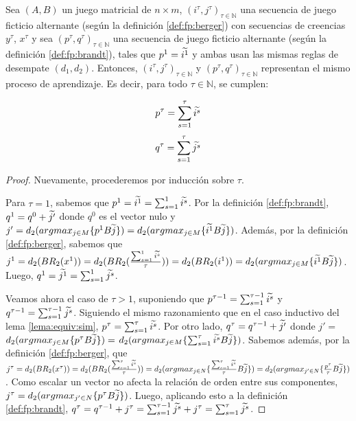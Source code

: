 \begin{lemma}
    Sea $(A, B)$ un juego matricial de $n \times m$, $(i^\tau, j^\tau)_{\tau \in \mathbb{N}}$ una secuencia de juego ficticio alternante (según la definición \ref{def:fp:berger}) con secuencias de creencias $y^\tau$, $x^\tau$ y sea $(p^\tau, q^\tau)_{\tau \in \mathbb{N}}$ una secuencia de juego ficticio alternante (según la definición \ref{def:fp:brandt}), tales que $p^1 = \widetilde{i^1}$ y ambas usan las mismas reglas de desempate $(d_1, d_2)$. Entonces, $(i^\tau, j^\tau)_{\tau \in \mathbb{N}}$ y $(p^\tau, q^\tau)_{\tau \in \mathbb{N}}$ representan el mismo proceso de aprendizaje. Es decir, para todo $\tau \in \mathbb{N}$, se cumplen:

    \[ p^{\tau} = \sum_{s=1}^\tau{\widetilde{i^s}} \]
    \[ q^{\tau} = \sum_{s=1}^\tau{\widetilde{j^s}} \]

\end{lemma}
\begin{proof}
    Nuevamente, procederemos por inducción sobre $\tau$.

    Para $\tau = 1$, sabemos que $p^1 = \widetilde{i^1} = \sum_{s=1}^1{\widetilde{i^s}}$.
    Por la definición \ref{def:fp:brandt}, $q^1 = q^0 + \widetilde{j'}$ donde $q^0$ es el vector nulo y
    $j' = d_2(argmax_{j \in M}\{p^{1}B\widetilde{j}\}) = d_2(argmax_{j \in M}\{\widetilde{i^{1}}B\widetilde{j}\})$.
    Además, por la definición \ref{def:fp:berger}, sabemos que
    $j^1 = d_2(BR_2(x^1)) = d_2(BR_2(\frac{\sum^1_{s=1} \widetilde{i^s}}{\tau})) = d_2(BR_2(i^1)) = d_2(argmax_{j \in M}\{\widetilde{i^{1}}B\widetilde{j}\})$.
    Luego, $q^1 = \widetilde{j^1} = \sum_{s=1}^1{\widetilde{j^s}}$.

    Veamos ahora el caso de $\tau > 1$, suponiendo que
    $p^{\tau-1} = \sum_{s=1}^{\tau-1}{\widetilde{i^s}}$ y $q^{\tau-1} = \sum_{s=1}^{\tau-1}{\widetilde{j^s}}$.
    Siguiendo el mismo razonamiento que en el caso inductivo del lema \ref{lema:equiv:sim},
    $p^{\tau} = \sum_{s=1}^\tau{\widetilde{i^s}}$.
    Por otro lado, $q^{\tau} = q^{\tau-1} + \widetilde{j'}$ donde
    $j' = $ $d_2(argmax_{j \in M}\{p^{\tau}B\widetilde{j}\}) =$ $d_2(argmax_{j \in M}\{\sum_{s=1}^\tau{\widetilde{i^s}}B\widetilde{j}\})$.
    Sabemos además, por la definición \ref{def:fp:berger}, que
    $j^\tau = d_2(BR_2(x^{\tau})) = d_2(BR_2(\frac{\sum_{s=1}^{\tau}{\widetilde{i^s}}}{\tau})) = d_2(argmax_{j \in N}\{\frac{\sum_{s=1}^{\tau}{\widetilde{i^s}}}{\tau}B\widetilde{j}\})  = d_2(argmax_{j' \in N}\{\frac{p^{\tau}}{\tau}B\widetilde{j}\})$.
    Como escalar un vector no afecta la relación de orden entre sus componentes,
    $j^\tau = d_2(argmax_{j' \in N}\{p^{\tau}B\widetilde{j}\})$.
    Luego, aplicando esto a la definición \ref{def:fp:brandt},
    $q^\tau = q^{\tau-1} + j^\tau = \sum_{s=1}^{\tau-1}{\widetilde{j^s}} + j^\tau = \sum_{s=1}^{\tau}{\widetilde{j^s}}$.
\end{proof}

